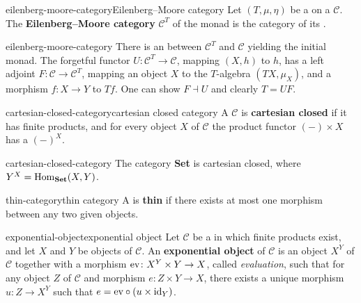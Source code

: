 \begin{topic}{eilenberg-moore-category}{Eilenberg--Moore category}
    Let $(T, \mu, \eta)$ be a  on a  $\mathcal{C}$. The \textbf{Eilenberg--Moore category} $\mathcal{C}^T$ of the monad is the category of its .
\end{topic}

\begin{example}{eilenberg-moore-category}
    There is an  between $\mathcal{C}^T$ and $\mathcal{C}$ yielding the initial monad. The forgetful functor $U \colon \mathcal{C}^T \to \mathcal{C}$, mapping $(X, h)$ to $h$, has a left adjoint $F \colon \mathcal{C} \to \mathcal{C}^T$, mapping an object $X$ to the $T$-algebra $(TX, \mu_X)$, and a morphism $f \colon X \to Y$ to $Tf$. One can show $F \dashv U$ and clearly $T = UF$.
\end{example}

\begin{topic}{cartesian-closed-category}{cartesian closed category}
    A  $\mathcal{C}$ is \textbf{cartesian closed} if it has finite products, and for every object $X$ of $\mathcal{C}$ the product functor $(-) \times X$ has a  $(-)^X$.
\end{topic}

\begin{example}{cartesian-closed-category}
    The category \textbf{Set} is cartesian closed, where $Y^X = \operatorname{Hom}_\textbf{Set}(X, Y)$.
\end{example}

\begin{topic}{thin-category}{thin category}
    A  is \textbf{thin} if there exists at most one morphism between any two given objects.
\end{topic}

\begin{topic}{exponential-object}{exponential object}
    Let $\mathcal{C}$ be a  in which finite products exist, and let $X$ and $Y$ be objects of $\mathcal{C}$. An \textbf{exponential object} of $\mathcal{C}$ is an object $X^Y$ of $\mathcal{C}$ together with a morphism $\textup{ev} \colon X^Y \times Y \to X$, called \textit{evaluation}, such that for any object $Z$ of $\mathcal{C}$ and morphism $e \colon Z \times Y \to X$, there exists a unique morphism $u \colon Z \to X^Y$ such that $e = \textup{ev} \circ (u \times \textup{id}_Y)$.
\end{topic}

